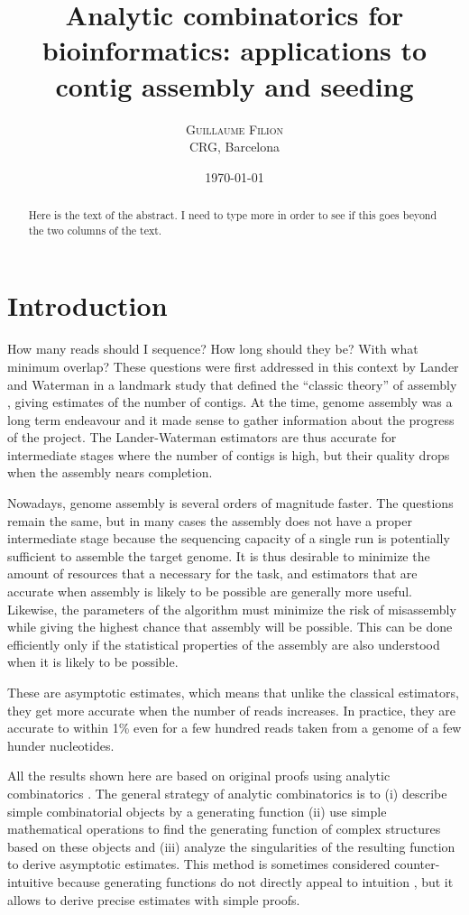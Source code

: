 \documentclass{article}
\title{Analytic combinatorics for bioinformatics: applications to
contig assembly and seeding}
\author{
\textsc{Guillaume Filion} \\ [1ex]
\normalsize CRG, Barcelona
}
\date{\today}
\begin{document}
\maketitle

\begin{abstract}
Here is the text of the abstract. I need to type more in order to see if
this goes beyond the two columns of the text.
\end{abstract}



\section{Introduction}

How many reads should I sequence? How long should they be? With what
minimum overlap? These questions were first addressed in this context by
Lander and Waterman in a landmark study that defined the ``classic
theory'' of assembly \cite{pmid3294162}, giving estimates of the number of
contigs. At the time, genome assembly was a long term endeavour and it
made sense to gather information about the progress of the project. The
Lander-Waterman estimators are thus accurate for intermediate stages where
the number of contigs is high, but their quality drops when the assembly
nears completion.

Nowadays, genome assembly is several orders of magnitude faster. The
questions remain the same, but in many cases the assembly does not have a
proper intermediate stage because the sequencing capacity of a single run
is potentially sufficient to assemble the target genome. It is thus
desirable to minimize the amount of resources that a necessary for the
task, and estimators that are accurate when assembly is likely to be
possible are generally more useful. Likewise, the parameters of the
algorithm must minimize the risk of misassembly while giving the highest
chance that assembly will be possible. This can be done efficiently only
if the statistical properties of the assembly are also understood when it
is likely to be possible.

These are asymptotic estimates, which means that unlike the classical
estimators, they get more accurate when the number of reads increases. In
practice, they are accurate to within 1\% even for a few hundred reads
taken from a genome of a few hunder nucleotides.

All the results shown here are based on original proofs using analytic
combinatorics \cite{AnalComb2009}. The general strategy of analytic
combinatorics is to (i) describe simple combinatorial objects by a
generating function (ii) use simple mathematical operations to find the
generating function of complex structures based on these objects and (iii)
analyze the singularities of the resulting function to derive asymptotic
estimates. This method is sometimes considered counter-intuitive because
generating functions do not directly appeal to intuition
\cite{AnalComb1996}, but it allows to derive precise estimates with simple
proofs.
\end{document}
